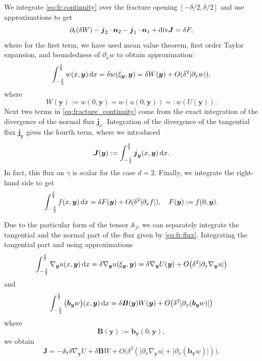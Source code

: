 \documentclass[a4paper]{article}
\def\prtl{\partial}
\def\vc#1{\mathbf{\boldsymbol{#1}}}     %
\def\tn#1{{\mathbb{#1}}}    %
\def\abs#1{\lvert#1\rvert}
\def\div{{\rm div}}
\def\grad{\nabla}
\def\d {\,{\rm d}}
\begin{document}
We integrate \eqref{eq:fr:continuity} over the fracture opening $[-\delta/2,\delta/2]$ and use approximations to get
\begin{equation}
    \label{eq:fracture_continuity}
   \prtl_t (\delta W) - \vc j_2 \cdot \vc n_2 - \vc j_1 \cdot \vc n_1 + \div \vc J = \delta F,
\end{equation}
where for the first term, we have used mean value theorem, first order Taylor expansion, 
and boundedness of $\prtl_x w$ to obtain approximation:
\[
    \int_{-\frac\delta2}^{\frac\delta2} w(x,\vc y) \d x=\delta w(\xi_{\vc y}, \vc y) = \delta W(\vc y) + O(\delta^2\abs{\prtl_x w}),
\]
where
\[
    W(\vc y):=w(0,\vc y)=w(u(0,\vc y))=:w(U(\vc y)).
\]
Next two terms in \eqref{eq:fracture_continuity} come from the exact integration 
of the divergence of the normal flux $\vc j_x$.
Integration of the divergence of the tangential flux $\vc j_{\vc y}$ gives the fourth term, where we introduced
\[
\vc J(\vc y) := \int_{-\frac\delta2}^{\frac\delta2} \vc j_{\vc y}(x, \vc y) \d x.
\]
In fact, this flux on $\gamma$ is scalar for the case $d=2$. Finally, we integrate the right-hand side to get 
\[
    \int_{-\frac\delta2}^{\frac\delta2} f(x,\vc y) \d x = \delta F(\vc y) + O(\delta^2\abs{\prtl_x f}),\quad F(\vc y):=f(0,\vc y). 
\]


Due to the particular form of the tensor $\tn A_f$, we can separately integrate the tangential and the normal
part of the flux given by \eqref{eq:fr:flux}. Integrating the tangential part and using approximations
\[
    \int_{-\frac\delta2}^{\frac\delta2}  \grad_{\vc y} u(x, \vc y) \d x = \delta \grad_{\vc y} u (\xi_{\vc y}, \vc y) 
    = \delta \grad_{\vc y} U( \vc y) + O\big( \delta^2 \abs{\prtl_x\grad_{\vc y} u} \big) 
\]
and
\[
 \int_{-\frac\delta2}^{\frac\delta2} \big(\vc b_{\vc y} w\big)(x, \vc y) \d x 
  = \delta \vc B(\vc y) W(\vc y) + O\big(\delta^2 \abs{\prtl_x(\vc b_{\vc y} w)} \big)
\]
where
\[
  \vc B(\vc y) := \vc b_{\vc y}(0, \vc y),
\]
we obtain
\begin{equation}
    \label{eq:fracture_darcy}
   \vc J = -\tn A_t \delta \grad_{\vc y} U + \delta \vc B W + O\big(\delta^2(\abs{\prtl_x\grad_{\vc y} u}+\abs{\prtl_x(\vc b_{\vc y} w)})\big).
\end{equation}
\end{document}

